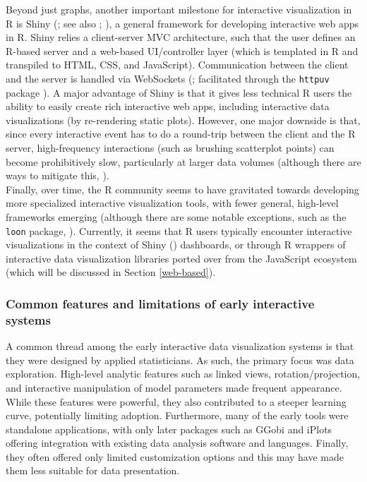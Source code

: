 \documentclass[
  openany]{book}
\theoremstyle{definition}
\theoremstyle{definition}
\theoremstyle{definition}
\theoremstyle{definition}
\theoremstyle{remark}
\begin{document}
Beyond just graphs, another important milestone for interactive visualization in R is Shiny (; see also ; ), a general framework for developing interactive web apps in R. Shiny relies a client-server MVC architecture, such that the user defines an R-based server and a web-based UI/controller layer (which is templated in R and transpiled to HTML, CSS, and JavaScript). Communication between the client and the server is handled via WebSockets (; facilitated through the \texttt{httpuv} package ). A major advantage of Shiny is that it gives less technical R users the ability to easily create rich interactive web apps, including interactive data visualizations (by re-rendering static plots). However, one major downside is that, since every interactive event has to do a round-trip between the client and the R server, high-frequency interactions (such as brushing scatterplot points) can become prohibitively slow, particularly at larger data volumes (although there are ways to mitigate this, ).\\
Finally, over time, the R community seems to have gravitated towards developing more specialized interactive visualization tools, with fewer general, high-level frameworks emerging (although there are some notable exceptions, such as the \texttt{loon} package, ). Currently, it seems that R users typically encounter interactive visualizations in the context of Shiny () dashboards, or through R wrappers of interactive data visualization libraries ported over from the JavaScript ecosystem (which will be discussed in Section \ref{web-based}).

\subsubsection{Common features and limitations of early interactive systems}\label{common-features-and-limitations-of-early-interactive-systems}

A common thread among the early interactive data visualization systems is that they were designed by applied statisticians. As such, the primary focus was data exploration. High-level analytic features such as linked views, rotation/projection, and interactive manipulation of model parameters made frequent appearance. While these features were powerful, they also contributed to a steeper learning curve, potentially limiting adoption. Furthermore, many of the early tools were standalone applications, with only later packages such as GGobi and iPlots offering integration with existing data analysis software and languages. Finally, they often offered only limited customization options and this may have made them less suitable for data presentation.
\end{document}
